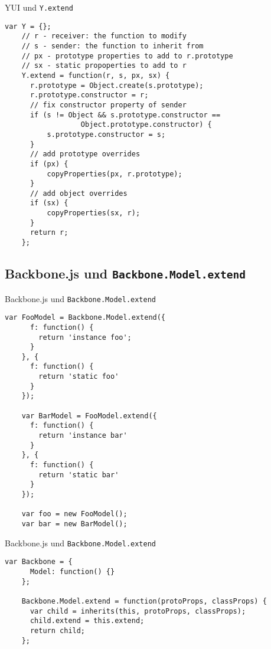 \begin{frame}[fragile]{YUI und \texttt{Y.extend}}
  \begin{lstlisting}[gobble=4]
    var Y = {};    
    // r - receiver: the function to modify
    // s - sender: the function to inherit from
    // px - prototype properties to add to r.prototype
    // sx - static propoperties to add to r
    Y.extend = function(r, s, px, sx) {
      r.prototype = Object.create(s.prototype);
      r.prototype.constructor = r;
      // fix constructor property of sender
      if (s != Object && s.prototype.constructor ==
                  Object.prototype.constructor) {
          s.prototype.constructor = s;
      }
      // add prototype overrides
      if (px) {
          copyProperties(px, r.prototype);
      }
      // add object overrides
      if (sx) {
          copyProperties(sx, r);
      }
      return r;
    };
  \end{lstlisting}
\end{frame}

\subsection{Backbone.js und \texttt{Backbone.Model.extend}}

\begin{frame}[fragile]{Backbone.js und \texttt{Backbone.Model.extend}}
  \begin{lstlisting}[gobble=4]
    var FooModel = Backbone.Model.extend({
      f: function() {
        return 'instance foo';
      }
    }, {
      f: function() {
        return 'static foo'
      }
    });
    
    var BarModel = FooModel.extend({
      f: function() {
        return 'instance bar'
      }
    }, {
      f: function() {
        return 'static bar'
      }
    });
    
    var foo = new FooModel();
    var bar = new BarModel();
  \end{lstlisting}
\end{frame}

\begin{frame}[fragile]{Backbone.js und \texttt{Backbone.Model.extend}}
  \begin{lstlisting}[gobble=4]
    var Backbone = {
      Model: function() {}
    };
    
    Backbone.Model.extend = function(protoProps, classProps) {
      var child = inherits(this, protoProps, classProps);
      child.extend = this.extend;
      return child;
    };
  \end{lstlisting}
\end{frame}

